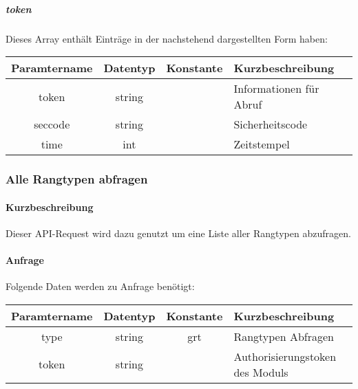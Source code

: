 \subparagraph{token}Dieses Array enthält Einträge in der nachstehend dargestellten Form haben:
\begin{table}[H]
	\begin{tabular}{|c|c|c|p{6.5cm}|}
		\hline
		\textbf{Paramtername} & \textbf{Datentyp} & \textbf{Konstante} & \textbf{Kurzbeschreibung}    \\ \hline
		token              & string            &                 & Informationen für Abruf \\ \hline
		seccode            & string            &                 & Sicherheitscode \\ \hline
		time               & int               &                 & Zeitstempel \\ \hline
	\end{tabular}
\end{table}
\subsubsection{Alle Rangtypen abfragen}
\paragraph{Kurzbeschreibung}Dieser API-Request wird dazu genutzt um eine Liste aller Rangtypen abzufragen.
\paragraph{Anfrage}Folgende Daten werden zu Anfrage benötigt:
\begin{table}[H]
	\begin{tabular}{|c|c|c|p{6.5cm}|}
		\hline
		\textbf{Paramtername} & \textbf{Datentyp} & \textbf{Konstante} & \textbf{Kurzbeschreibung}                                                                                               \\ \hline
		type                & string            & grt                & Rangtypen Abfragen \\ \hline
		token               & string            &                    & Authorisierungstoken des Moduls \\ \hline
	\end{tabular}
\end{table}
